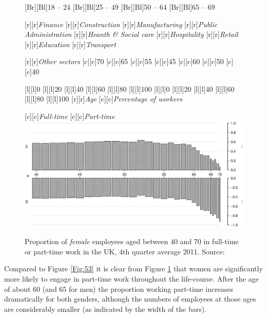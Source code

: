 \documentclass[11 pt, a4paper]{report}
\begin{document}
\begin{figure}[hbtp!]
[Br][Bl]{\small{18 -- 24}}
[Br][Bl]{\small{25 -- 49}}
[Br][Bl]{\small{50 -- 64}}
[Br][Bl]{\small{65 -- 69}}


[r][r]{\small{\emph{Finance}}}
[r][r]{\small{\emph{Construction}}}
[r][r]{\small{\emph{Manufacturing}}}
[r][r]{\small{\emph{Public Administration}}}
[r][r]{\small{\emph{Heanth \& Social care}}}
[r][r]{\small{\emph{Hospitality}}}
[r][r]{\small{\emph{Retail}}}
[r][r]{\small{\emph{Education}}}
[r][r]{\small{\emph{Transport}}}

[r][r]{\small{\emph{Other sectors}}}
[c][c]{\small{70}}
[c][c]{\small{65}}
[c][c]{\small{55}}
[c][c]{\small{45}}
[c][c]{\small{60}}
[c][c]{\small{50}}
[c][c]{\small{40}}

[l][l]{\small{0}}
[l][l]{\small{20}}
[l][l]{\small{40}}
[l][l]{\small{60}}
[l][l]{\small{80}}
[l][l]{\small{100}}
[l][l]{\small{0}}
[l][l]{\small{20}}
[l][l]{\small{40}}
[l][l]{\small{60}}
[l][l]{\small{80}}
[l][l]{\small{100}}
[r][r]{\small{\emph{Age}}}
[c][c]{\small{\emph{Percentage of workers}}}

[c][c]{\small{\emph{Full-time}}}
[c][c]{\small{\emph{Part-time}}}
\includegraphics[width=\textwidth]{../figures/Fig5.3.eps}
\caption{Proportion of \emph{female} employees aged between 40 and 70 in full-time or part-time work in the UK, 4th quarter average 2011. Source: \cite{DWP2013}}\label{Fig:54}
\end{figure}

Compared to Figure \ref{Fig:53} it is clear from Figure \ref{Fig:54} that women are significantly more likely to engage in part-time work throughout the life-course. After the age of about 60 (and 65 for men) the proportion working part-time increases dramatically for both genders, although the numbers of employees at those ages are considerably smaller (as indicated by the width of the bars). 
\end{document}
